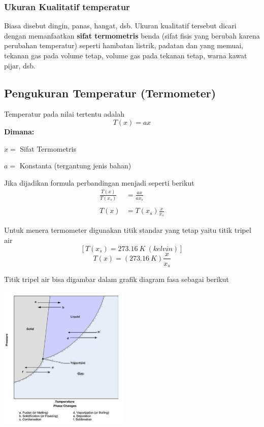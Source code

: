 \documentclass[twocolumn, 11pt]{article}%
\begin{document}
        \subsubsection{Ukuran Kualitatif temperatur}
        Biasa disebut dingin, panas, hangat, dsb. Ukuran kualitatif tersebut dicari dengan memanfaatkan \textbf{sifat termometris} benda (sifat fisis yang berubah karena perubahan temperatur) seperti hambatan listrik, padatan dan yang memuai, tekanan gas pada volume tetap, volume gas pada tekanan tetap, warna kawat pijar, dsb.

    \subsection{Pengukuran Temperatur (Termometer)}
        Temperatur pada nilai tertentu adalah
        \[T(x) = ax \]
        \textbf{Dimana:}

        $x=$ Sifat Termometris
        
        $a=$ Konstanta (tergantung jenis bahan)

        Jika dijadikan formula perbandingan menjadi seperti berikut
        \begin{equation*}
            \begin{split}
                \frac{T(x)}{T(x_s)} &= \frac{ax}{ax_s}\\\\
                T(x) &= T(x_s) \frac{x}{x_s}
            \end{split}
        \end{equation*}

        Untuk menera termometer digunakan titik standar yang tetap yaitu titik tripel air
        $$[T(x_s) = 273.16\ K\ (kelvin)]$$
        $$ T(x) = (273.16\ K) \frac{x}{x_s}$$

        Titik tripel air bisa digambar dalam grafik diagram fasa sebagai berikut

        \begin{center}
            \includegraphics[width=235px]{2.png}
        \end{center}
\end{document}
